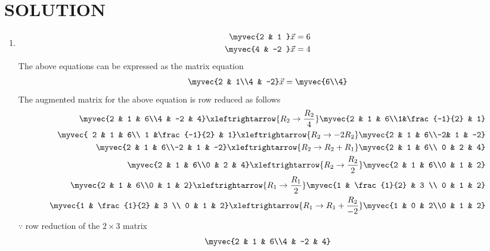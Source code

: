 \documentclass[journal,12pt,twocolumn]{IEEEtran}
\begin{document}
\section{SOLUTION}  
\begin{enumerate}
\item
\begin{align}
\begin{split}
\myvec{2 & 1 }\vec{x}&=6
\\
\myvec{4 & -2 }\vec{x}&=4
\end{split}
\end{align}
The above equations can be expressed as the matrix equation
\begin{align}
\myvec{2 & 1\\4 & -2} \vec{x} = \myvec{6\\4}
\end{align}
%
The augmented matrix for the above equation is row reduced as follows
\begin{align}
\myvec{2 & 1 & 6\\4 & -2 & 4} 
\xleftrightarrow {R_2\rightarrow \frac{R_2}{4}}\myvec{2 & 1 & 6\\1&\frac{-1}{2} & 1} 
\\
\myvec{ 2 & 1 & 6\\ 1 &\frac{-1}{2} & 1}
\xleftrightarrow{R_2\rightarrow -2R_2}
\myvec{2 & 1 & 6\\-2& 1 & -2}
\\
\myvec{2 & 1 & 6\\-2 & 1 & -2}
\xleftrightarrow{R_2\rightarrow R_2+R_1}
\myvec{2 & 1 & 6\\ 0 & 2 & 4}
\\
\myvec{2 & 1 & 6\\0 & 2 & 4}
\xleftrightarrow{R_2\rightarrow\frac{R_2}{2}}
\myvec{2 & 1 & 6\\0 & 1 & 2}
\\
\myvec{2 & 1 & 6\\0 & 1 & 2}
\xleftrightarrow{R_1\rightarrow\frac{R_1}{2}}
\myvec{1 & \frac{1}{2} & 3 \\ 0 & 1 & 2}
\\
\myvec{1 & \frac{1}{2} & 3 \\ 0 & 1 & 2}
\xleftrightarrow{R_1\rightarrow R_1+\frac{R_2}{-2}}
\myvec{1 & 0 & 2\\0 & 1 & 2}
\end{align}
%
$\because$ row reduction of the $2\times 3$ matrix
%
\begin{align}
\myvec{2 & 1 & 6\\4 & -2 & 4}

\end{align}
\end{enumerate}
\end{document}
